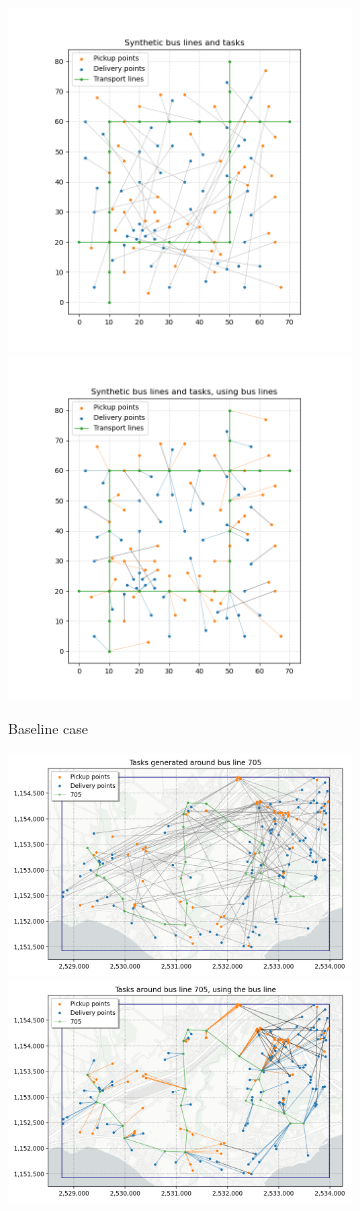 \begin{figure}
    \centering
    \begin{subfigure}{\linewidth}
        \centering
        \includegraphics[width=0.49\linewidth]{../fig/synthetic_tasks.png}
        \includegraphics[width=0.49\linewidth]{../fig/synthetic_tasks_bus.png}
        \caption{Baseline case}        
    \end{subfigure}
    \begin{subfigure}{\linewidth}
        \includegraphics[width=0.49\linewidth]{../fig/l705_tasks.png}
        \includegraphics[width=0.49\linewidth]{../fig/l705_tasks_bus.png}

\end{subfigure}
\end{figure}
